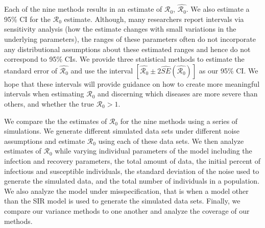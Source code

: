 \documentclass[12pt]{article}
\newcommand{\wxxsir}{nine } %
\newcommand{\rr}{\ensuremath{\mathcal{R}_0}}
\begin{document}
Each of the \wxxsir methods results in an estimate of $\rr$, $\hat{\rr}$.  We also estimate a 95\% CI for the  $\rr$ estimate.  Although, many researchers report intervals via sensitivity analysis (how the estimate changes with small variations in the underlying parameters), the ranges of these parameters often do not incorporate any distributional assumptions about these estimated ranges and hence do not correspond to 95\% CIs.  We provide three statistical methods to estimate the standard error of $\hat{\rr}$ and use the interval $\left [\hat{\rr} \pm 2\hat{SE}\left (\hat{\rr} \right ) \right ]$ as our 95\% CI.  We hope that these intervals will provide guidance on how to create more meaningful intervals when estimating $\rr$ and discerning which diseases are more severe than others, and whether the true $\rr >1$.

We compare the the estimates of $\rr$ for the \wxxsir methods using a series of simulations.  We generate different simulated data sets under different noise assumptions and estimate $\rr$ using each of these data sets.  We then analyze estimates of $\rr$ while varying individual parameters of the model including the infection and recovery parameters, the total amount of data, the initial percent of infectious and susceptible individuals, the standard deviation of the noise used to generate the simulated data, and the total number of individuals in a population.  We also analyze the model under misspecification, that is when a model other than the SIR model is used to generate the simulated data sets.  Finally, we compare our variance methods to one another and analyze the coverage of our methods.

\end{document}
